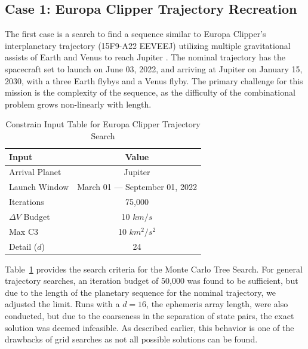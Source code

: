 \documentclass[letterpaper, paper,11pt]{AAS}	%
\begin{document}
\subsection{Case 1: Europa Clipper Trajectory Recreation}

The first case is a search to find a sequence similar to Europa Clipper's interplanetary trajectory (15F9-A22 EEVEEJ) utilizing multiple gravitational assists of Earth and Venus to reach Jupiter \cite{Buffington2014}. The nominal trajectory has the spacecraft set to launch on June 03, 2022, and arriving at Jupiter on January 15, 2030, with a three Earth flybys and a Venus flyby. The primary challenge for this mission is the complexity of the sequence, as the difficulty of the combinational problem grows non-linearly with length.

\begin{table}[htb]
    \centering
    \caption{Constrain Input Table for Europa Clipper Trajectory Search}
    \label{table:clipInputs}
    \begin{tabular}{lc}
        \toprule
        \textbf{Input} & \textbf{Value}\\
        \midrule
        Arrival Planet & Jupiter \\
        Launch Window \hspace{1em}& March 01 --- September 01, 2022 \\
        Iterations & 75,000 \\
        $\Delta V$ Budget & 10 $km/s$ \\
        Max C3 & 10 $km^2/s^2$ \\
        Detail ($d$) & 24 \\
        \bottomrule
    \end{tabular}
\end{table}

Table~\ref*{table:clipInputs} provides the search criteria for the Monte Carlo Tree Search. For general trajectory searches, an iteration budget of 50,000 was found to be sufficient, but due to the length of the planetary sequence for the nominal trajectory, we adjusted the limit. Runs with a $d = 16$, the ephemeris array length, were also conducted, but due to the coarseness in the separation of state pairs, the exact solution was deemed infeasible. As described earlier, this behavior is one of the drawbacks of grid searches as not all possible solutions can be found.
\end{document}
